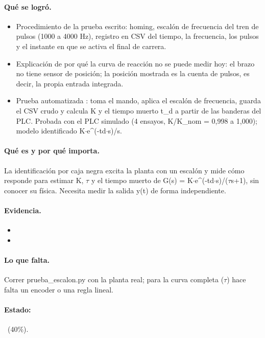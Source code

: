 \documentclass[a4paper,11pt]{article}
\begin{document}
\paragraph{Qué se logró.}
\begin{itemize}
\item Procedimiento de la prueba escrito: homing, escalón de frecuencia del tren de pulsos (1000 a 4000 Hz), registro en CSV del tiempo, la frecuencia, los pulsos y el instante en que se activa el final de carrera.
\item Explicación de por qué la curva de reacción no se puede medir hoy: el brazo no tiene sensor de posición; la posición mostrada es la cuenta de pulsos, es decir, la propia entrada integrada.
\item Prueba automatizada : toma el mando, aplica el escalón de frecuencia, guarda el CSV crudo y calcula K y el tiempo muerto t\_d a partir de las banderas del PLC. Probada con el PLC simulado (4 ensayos, K/K\_nom = 0,998 a 1,000); modelo identificado K$\cdot$e\^{}(-td$\cdot$s)/s.
\end{itemize}
\paragraph{Qué es y por qué importa.} La identificación por caja negra excita la planta con un escalón y mide cómo responde para estimar K, $\tau$ y el tiempo muerto de G(s) = K$\cdot$e\^{}(-td$\cdot$s)/($\tau$s+1), sin conocer su física. Necesita medir la salida y(t) de forma independiente.
\paragraph{Evidencia.}
\begin{itemize}\small
\item {}
\item {}
\end{itemize}
\paragraph{Lo que falta.} Correr prueba\_escalon.py con la planta real; para la curva completa ($\tau$) hace falta un encoder o una regla lineal.
\paragraph{Estado:} \parcial~(40\%).
\end{document}
